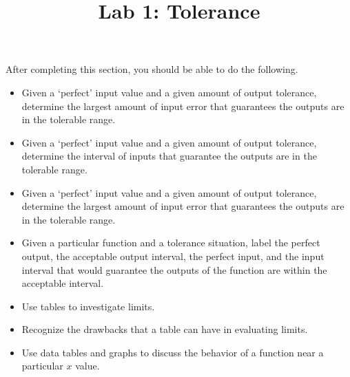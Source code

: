 \documentclass{ximera}
\title{Lab 1: Tolerance}
\begin{document}
\begin{abstract}
\end{abstract}

\maketitle

\begin{sectionOutcomes}

After completing this section, you should be able to do the following.

\begin{itemize}
	\item Given a `perfect' input value and a given amount of output tolerance, determine the largest amount of input error that guarantees the outputs are in the tolerable range. 
 	\item Given a `perfect' input value and a given amount of output tolerance, determine the interval of inputs that guarantee the outputs are in the tolerable range.
 	\item Given a `perfect' input value and a given amount of output tolerance, determine the largest amount of input error that guarantees the outputs are in the tolerable range. 
    \item Given a particular function and a tolerance situation, label the perfect output, the acceptable output interval, the perfect input, and the input interval that would guarantee the outputs of the function are within the acceptable interval.
    \item Use tables to investigate limits.
    \item Recognize the drawbacks that a table can have in evaluating limits.
    \item Use data tables and graphs to discuss the behavior of a function near a particular $x$ value. 
\end{itemize}
\end{sectionOutcomes}
\end{document}
